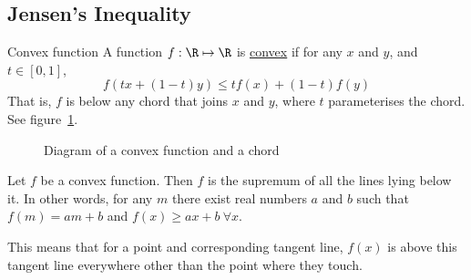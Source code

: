 \documentclass[../Main.tex]{subfiles}
\begin{document}
\subsection{Jensen's Inequality}
\begin{definition}{Convex function}
    A function $f : \R \mapsto \R$ is \underline{convex} if for any $x$ and $y$, and $t \in [0, 1]$,
    \begin{equation*}
        f(tx + (1-t)y) \leq tf(x) + (1-t) f(y)
    \end{equation*}
    That is, $f$ is below any chord that joins $x$ and $y$, where $t$ parameterises the chord. See figure~\ref{figConvexCurve}.
\end{definition}
\begin{figure}[ht]
    \centering
    \caption{Diagram of a convex function and a chord}
    \label{figConvexCurve}
\end{figure}
\begin{proposition}
    Let $f$ be a convex function. Then $f$ is the supremum of all the lines lying below it. In other words, for any $m$ there exist real numbers $a$ and $b$ such that $f(m) = am+b$ and $f(x) \geq ax + b~\forall x$.
    \label{propTangentBelowConvex}
\end{proposition}
This means that for a point and corresponding tangent line, $f(x)$ is above this tangent line everywhere other than the point where they touch.
\end{document}
